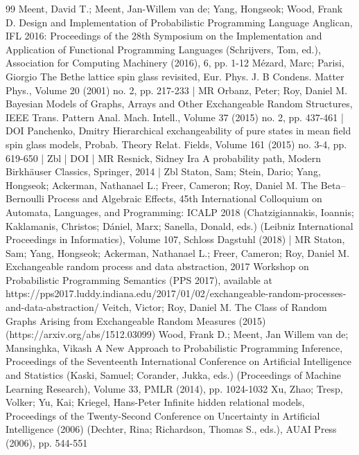 \begin{thebibliography}{99}
Meent, David T.; Meent, Jan-Willem van de; Yang, Hongseok; Wood, Frank D. Design and Implementation of Probabilistic Programming Language Anglican, IFL 2016: Proceedings of the 28th Symposium on the Implementation and Application of Functional Programming Languages (Schrijvers, Tom, ed.), Association for Computing Machinery (2016), 6, pp. 1-12
Mézard, Marc; Parisi, Giorgio The Bethe lattice spin glass revisited, Eur. Phys. J. B Condens. Matter Phys., Volume 20 (2001) no. 2, pp. 217-233 | MR
Orbanz, Peter; Roy, Daniel M. Bayesian Models of Graphs, Arrays and Other Exchangeable Random Structures, IEEE Trans. Pattern Anal. Mach. Intell., Volume 37 (2015) no. 2, pp. 437-461 | DOI
Panchenko, Dmitry Hierarchical exchangeability of pure states in mean field spin glass models, Probab. Theory Relat. Fields, Volume 161 (2015) no. 3-4, pp. 619-650 | Zbl | DOI | MR
Resnick, Sidney Ira A probability path, Modern Birkhäuser Classics, Springer, 2014 | Zbl
Staton, Sam; Stein, Dario; Yang, Hongseok; Ackerman, Nathanael L.; Freer, Cameron; Roy, Daniel M. The Beta–Bernoulli Process and Algebraic Effects, 45th International Colloquium on Automata, Languages, and Programming: ICALP 2018 (Chatzigiannakis, Ioannis; Kaklamanis, Christos; Dániel, Marx; Sanella, Donald, eds.) (Leibniz International Proceedings in Informatics), Volume 107, Schloss Dagstuhl (2018) | MR
Staton, Sam; Yang, Hongseok; Ackerman, Nathanael L.; Freer, Cameron; Roy, Daniel M. Exchangeable random process and data abstraction, 2017 Workshop on Probabilistic Programming Semantics (PPS 2017), available at https://pps2017.luddy.indiana.edu/2017/01/02/exchangeable-random-processes-and-data-abstraction/
Veitch, Victor; Roy, Daniel M. The Class of Random Graphs Arising from Exchangeable Random Measures (2015) (https://arxiv.org/abs/1512.03099)
Wood, Frank D.; Meent, Jan Willem van de; Mansinghka, Vikash A New Approach to Probabilistic Programming Inference, Proceedings of the Seventeenth International Conference on Artificial Intelligence and Statistics (Kaski, Samuel; Corander, Jukka, eds.) (Proceedings of Machine Learning Research), Volume 33, PMLR (2014), pp. 1024-1032
Xu, Zhao; Tresp, Volker; Yu, Kai; Kriegel, Hans-Peter Infinite hidden relational models, Proceedings of the Twenty-Second Conference on Uncertainty in Artificial Intelligence (2006) (Dechter, Rina; Richardson, Thomas S., eds.), AUAI Press (2006), pp. 544-551
\end{thebibliography}
